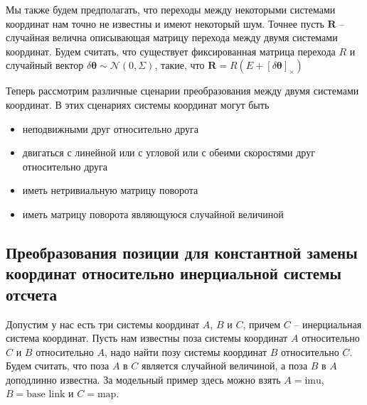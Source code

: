 \documentclass[12pt]{article}
\begin{document}
Мы также будем предполагать, что переходы между некоторыми системами
координат нам точно не известны и имеют некоторый шум. Точнее
пусть $\pmb{R}$ -- случайная велична описывающая матрицу перехода между
двумя системами координат. Будем считать, что существует фиксированная матрица
перехода $R$ и случайный вектор $\delta\pmb{\theta}\sim\mathcal{N}(0, \Sigma)$,
такие, что $\pmb{R}=R(E+[\delta\pmb{\theta}]_\times)$

Теперь рассмотрим различные сценарии преобразования между двумя системами
координат. В этих сценариях системы координат
могут быть
\begin{itemize}
    \item неподвижными друг относительно друга
    \item двигаться с линейной или с угловой или с обеими скоростями
          друг относительно друга
    \item иметь нетривиальную матрицу поворота
    \item иметь матрицу поворота являющуюся случайной величиной
\end{itemize}

\subsection{Преобразования позиции для константной замены координат
    относительно инерциальной системы отсчета
}

Допустим у нас есть три системы координат $A$, $B$ и $C$,
причем $C$ -- инерциальная система координат.
Пусть нам известны поза системы координат $A$ относительно $C$ и $B$
относительно $A$, надо найти позу системы координат $B$ относительно $C$.
Будем считать, что поза $A$ в $C$ является случайной величиной, а поза $B$
в $A$ доподлинно известна. За модельный пример здесь можно
взять $A=\mbox{imu}$, $B=\mbox{base link}$ и $C=\mbox{map}$.
\end{document}
